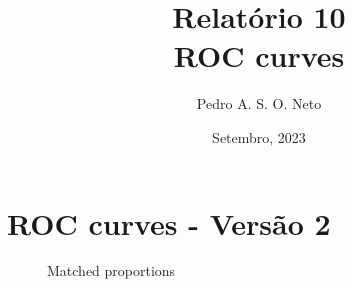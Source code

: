\documentclass{article}
\title{Relatório 10 \\ ROC curves}
\author{Pedro A. S. O. Neto}
\date{Setembro, 2023}
\begin{document}
\maketitle

\section{ROC curves - Versão 2}

\begin{figure}[H]
  \caption{Matched proportions}
  \noindent{}
  \centering
\end{figure}
\end{document}
